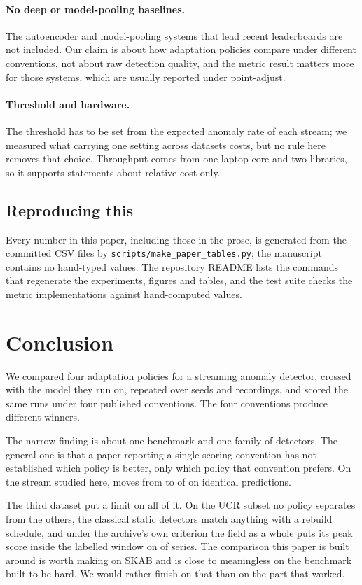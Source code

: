 \paragraph{No deep or model-pooling baselines.} The autoencoder and model-pooling
systems that lead recent leaderboards \citep{yoon2022arcus} are not included.
Our claim is about how adaptation policies compare under different conventions,
not about raw detection quality, and the metric result matters more for those
systems, which are usually reported under point-adjust.

\paragraph{Threshold and hardware.} The threshold has to be set from the
expected anomaly rate of each stream; we measured what carrying one setting
across datasets costs, but no rule here removes that choice. Throughput comes
from one laptop core and two libraries, so it supports statements about relative
cost only.

\subsection{Reproducing this}

Every number in this paper, including those in the prose, is generated from the
committed CSV files by \texttt{scripts/make\_paper\_tables.py}; the manuscript
contains no hand-typed values. The repository README lists the commands that
regenerate the experiments, figures and tables, and the test suite checks the
metric implementations against hand-computed values.

\section{Conclusion}

We compared four adaptation policies for a streaming anomaly detector, crossed
with the model they run on, repeated over \NSeeds{} seeds and \NRecordings{}
recordings, and scored the same runs under four published conventions. The four
conventions produce \NDistinctWinners{} different winners.

The narrow finding is about one benchmark and one family of detectors. The
general one is that a paper reporting a single scoring convention has not
established which policy is better, only which policy that convention prefers.
On the stream studied here, \MoverName{} moves from \MoverPointRank{} to
\MoverCompositeRank{} of \NStrategies{} on identical predictions.

The third dataset put a limit on all of it. On the UCR subset no policy
separates from the others, the classical static detectors match anything with a
rebuild schedule, and under the archive's own criterion the field as a whole
puts its peak score inside the labelled window on \MeanUcrTopOne{} of series.
The comparison this paper is built around is worth making on SKAB and is close
to meaningless on the benchmark built to be hard. We would rather finish on that
than on the part that worked.
